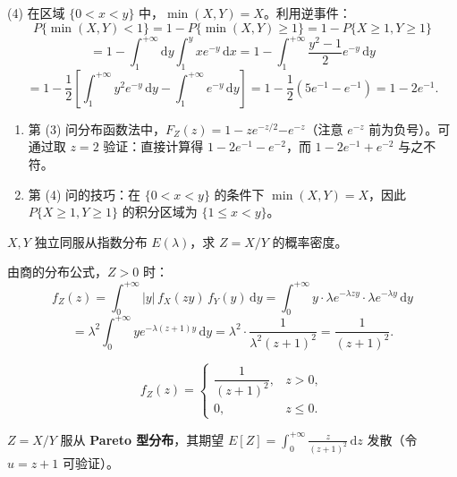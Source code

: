 \documentclass[lang=cn,11pt]{elegantbook}
\begin{document}
\begin{solution}
\[\]
(4) 在区域 $\{0 < x < y\}$ 中，$\min(X,Y) = X$。利用逆事件：
\[
P\{\min(X,Y) < 1\} = 1 - P\{\min(X,Y) \geqslant 1\} = 1 - P\{X \geqslant 1, Y \geqslant 1\}
\]
\[
= 1 - \int_1^{+\infty}\mathrm{d}y\int_1^y xe^{-y}\,\mathrm{d}x = 1 - \int_1^{+\infty}\frac{y^2-1}{2}e^{-y}\,\mathrm{d}y
\]
\[
= 1 - \frac{1}{2}\left[\int_1^{+\infty}y^2 e^{-y}\,\mathrm{d}y - \int_1^{+\infty}e^{-y}\,\mathrm{d}y\right] = 1 - \frac{1}{2}(5e^{-1} - e^{-1}) = 1 - 2e^{-1}.
\]
\begin{note}
\begin{enumerate}
    \item 第 (3) 问分布函数法中，$F_Z(z) = 1 - ze^{-z/2} \boldsymbol{-} e^{-z}$（注意 $e^{-z}$ 前为负号）。可通过取 $z = 2$ 验证：直接计算得 $1 - 2e^{-1} - e^{-2}$，而 $1 - 2e^{-1} + e^{-2}$ 与之不符。
    \item 第 (4) 问的技巧：在 $\{0 < x < y\}$ 的条件下 $\min(X,Y) = X$，因此 $P\{X \geqslant 1, Y \geqslant 1\}$ 的积分区域为 $\{1 \leqslant x < y\}$。
\end{enumerate}
\end{note}
\end{solution}


\begin{exercise}[商的分布] \label{exer:3-c15}
$X, Y$ 独立同服从指数分布 $E(\lambda)$，求 $Z = X/Y$ 的概率密度。
\end{exercise}

\begin{solution}
由商的分布公式，$Z > 0$ 时：
\[
f_Z(z) = \int_0^{+\infty}|y|\,f_X(zy)\,f_Y(y)\,\mathrm{d}y = \int_0^{+\infty}y\cdot\lambda e^{-\lambda zy}\cdot\lambda e^{-\lambda y}\,\mathrm{d}y
\]
\[
= \lambda^2\int_0^{+\infty}ye^{-\lambda(z+1)y}\,\mathrm{d}y = \lambda^2\cdot\frac{1}{\lambda^2(z+1)^2} = \frac{1}{(z+1)^2}.
\]

\[
f_Z(z) = \begin{cases} \dfrac{1}{(z+1)^2}, & z > 0, \\ 0, & z \leqslant 0. \end{cases}
\]

\begin{note}
$Z = X/Y$ 服从 \textbf{Pareto 型分布}，其期望 $E[Z] = \displaystyle\int_0^{+\infty}\frac{z}{(z+1)^2}\,\mathrm{d}z$ 发散（令 $u = z+1$ 可验证）。
\end{note}
\end{solution}
\end{document}
